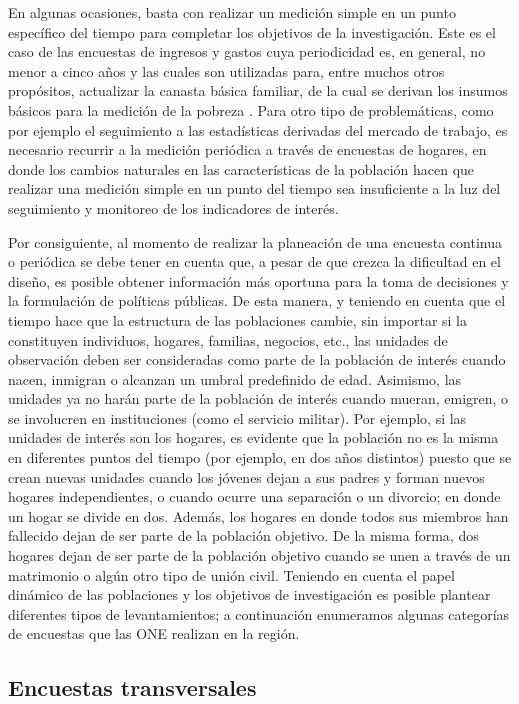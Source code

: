 \documentclass[
  12pt,
  spanish,
]{book}
\begin{document}
En algunas ocasiones, basta con realizar un medición simple en un punto específico del tiempo para completar los objetivos de la investigación. Este es el caso de las encuestas de ingresos y gastos cuya periodicidad es, en general, no menor a cinco años y las cuales son utilizadas para, entre muchos otros propósitos, actualizar la canasta básica familiar, de la cual se derivan los insumos básicos para la medición de la pobreza \citep{CEPAL_2018}. Para otro tipo de problemáticas, como por ejemplo el seguimiento a las estadísticas derivadas del mercado de trabajo, es necesario recurrir a la medición periódica a través de encuestas de hogares, en donde los cambios naturales en las características de la población hacen que realizar una medición simple en un punto del tiempo sea insuficiente a la luz del seguimiento y monitoreo de los indicadores de interés.

Por consiguiente, al momento de realizar la planeación de una encuesta continua o periódica se debe tener en cuenta que, a pesar de que crezca la dificultad en el diseño, es posible obtener información más oportuna para la toma de decisiones y la formulación de políticas públicas. De esta manera, y teniendo en cuenta que el tiempo hace que la estructura de las poblaciones cambie, sin importar si la constituyen individuos, hogares, familias, negocios, etc., las unidades de observación deben ser consideradas como parte de la población de interés cuando nacen, inmigran o alcanzan un umbral predefinido de edad. Asimismo, las unidades ya no harán parte de la población de interés cuando mueran, emigren, o se involucren en instituciones (como el servicio militar). Por ejemplo, si las unidades de interés son los hogares, es evidente que la población no es la misma en diferentes puntos del tiempo (por ejemplo, en dos años distintos) puesto que se crean nuevas unidades cuando los jóvenes dejan a sus padres y forman nuevos hogares independientes, o cuando ocurre una separación o un divorcio; en donde un hogar se divide en dos. Además, los hogares en donde todos sus miembros han fallecido dejan de ser parte de la población objetivo. De la misma forma, dos hogares dejan de ser parte de la población objetivo cuando se unen a través de un matrimonio o algún otro tipo de unión civil. Teniendo en cuenta el papel dinámico de las poblaciones y los objetivos de investigación es posible plantear diferentes tipos de levantamientos; a continuación enumeramos algunas categorías de encuestas que las ONE realizan en la región.

\hypertarget{encuestas-transversales}{%
\subsection{Encuestas transversales}\label{encuestas-transversales}}
\end{document}
